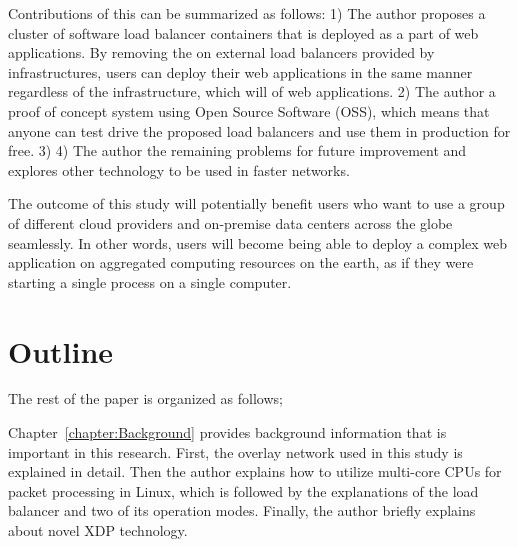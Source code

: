 Contributions of this  can be summarized as follows:
1) The author proposes a cluster of software load balancer containers that is deployed as a part of web applications.
By removing the  on external load balancers provided by infrastructures, users can deploy their web applications in the same manner regardless of the infrastructure, which will  of web applications.
2) The author  a proof of concept system using Open Source Software (OSS), which means that anyone can test drive the proposed load balancers and use them in production for free.
3) 
4) The author  the remaining problems for future improvement and explores other technology to be used in faster networks.

The outcome of this study will  potentially benefit users who want to use a group of different cloud providers and on-premise data centers across the globe seamlessly.
In other words, users will become being able to deploy a complex web application on aggregated computing resources on the earth, as if they were starting a single process on a single computer.

\section{Outline}


The rest of the paper is organized as follows;

Chapter~\ref{chapter:Background} provides background information that is important in this research.
First, the overlay network used in this study is explained in detail.
Then the author explains how to utilize multi-core CPUs for packet processing in Linux,
which is followed by the explanations of the  load balancer and two of its operation modes.
Finally, the author briefly explains about novel XDP technology.

